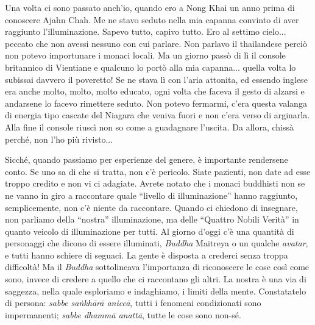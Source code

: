 Una volta ci sono passato anch'io, quando ero a Nong Khai un anno prima
di conoscere Ajahn Chah. Me ne stavo seduto nella mia capanna convinto
di aver raggiunto l'illuminazione. Sapevo tutto, capivo tutto. Ero al
settimo cielo... peccato che non avessi nessuno con cui parlare. Non
parlavo il thailandese perciò non potevo importunare i monaci locali. Ma
un giorno passò di lì il console britannico di Vientiane e qualcuno lo
portò alla mia capanna... quella volta lo subissai davvero il poveretto!
Se ne stava lì con l'aria attonita, ed essendo inglese era anche molto,
molto, molto educato, ogni volta che faceva il gesto di alzarsi e
andarsene lo facevo rimettere seduto. Non potevo fermarmi, c'era questa
valanga di energia tipo cascate del Niagara che veniva fuori e non c'era
verso di arginarla. Alla fine il console riuscì non so come a guadagnare
l'uscita. Da allora, chissà perché, non l'ho più rivisto...

Sicché, quando passiamo per esperienze del genere, è importante
rendersene conto. Se uno sa di che si tratta, non c'è pericolo. Siate
pazienti, non date ad esse troppo credito e non vi ci adagiate. Avrete
notato che i monaci buddhisti non se ne vanno in giro a raccontare quale
``livello di illuminazione'' hanno raggiunto, semplicemente, non c'è
niente da raccontare. Quando ci chiedono di insegnare, non parliamo
della ``nostra” illuminazione, ma delle ``Quattro Nobili Verità” in quanto
veicolo di illuminazione per tutti. Al giorno d'oggi c'è una quantità di
personaggi che dicono di essere illuminati, \textit{Buddha} Maitreya o un qualche
\textit{avatar}, e tutti hanno schiere di seguaci. La gente è disposta a crederci
senza troppa difficoltà! Ma il \textit{Buddha} sottolineava l'importanza di
riconoscere le cose così come sono, invece di credere a quello che ci
raccontano gli altri. La nostra è una via di saggezza, nella quale
esploriamo e indaghiamo, i limiti della mente. Constatatelo di persona:
\textit{sabbe saṅkhārā aniccā}, tutti i fenomeni condizionati sono impermanenti;
\textit{sabbe dhammā anattā}, tutte le cose sono non-sé.
